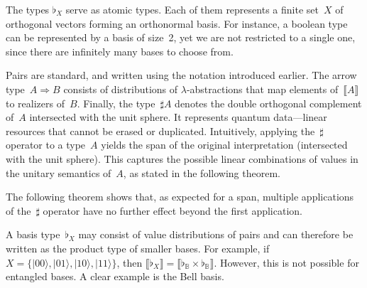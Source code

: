 \documentclass[runningheads,orivec,envcountsame,envcountsect]{llncs}
\providecommand{\qed}{\hbox{\rule{1ex}{1ex}}}%
\newcommand\ket[1]{\ensuremath{|#1\rangle}}
\newcommand\Span[1]{\ensuremath{{\mathsf{Span}}{#1}}}
\def\Sph{\mathcal{S}_1}       %
\def\Arr{\Rightarrow}
\def\sem#1{\llbracket#1\rrbracket}
\newcommand\B{\mathbb B}
\newcommand\basis[1]{\ensuremath{\flat_{#1}}}
\begin{document}
The types $\basis{X}$ serve as atomic types. Each of them represents a finite
set~$X$ of orthogonal vectors forming an orthonormal basis. For instance, a
boolean type can be represented by a basis of size~2, yet we are not restricted
to a single one, since there are infinitely many bases to choose from.

Pairs are standard, and written using the notation introduced earlier.
The arrow type~$A\Arr B$ consists of distributions of $\lambda$-abstractions
that map elements of~$\sem{A}$ to realizers of~$B$.  
Finally, the type~$\sharp A$ denotes the double orthogonal complement of~$A$
intersected with the unit sphere.
It represents quantum data---linear resources that cannot be erased or
duplicated.  
Intuitively, applying the~$\sharp$ operator to a type~$A$ yields the span of the
original interpretation (intersected with the unit sphere).  This captures the
possible linear combinations of values in the unitary semantics of~$A$, as
stated in the following theorem.




The following theorem shows that, as expected for a span, multiple
applications of the~$\sharp$ operator have no further effect beyond the first
application.


\begin{remark}
  A basis type~$\basis{X}$ may consist of value distributions of pairs and can
  therefore be written as the product type of smaller bases. For example, if
  $X=\{\ket{00},\ket{01},\ket{10},\ket{11}\}$, then $\sem{\basis{X}}=\sem{\basis{\B}\times\basis{\B}}$.
  However, this is not possible for entangled bases. A clear example is the
  Bell basis.
\end{remark}
\end{document}

